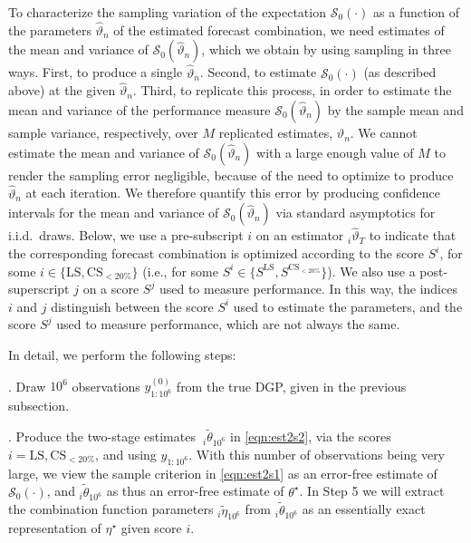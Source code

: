 \documentclass[12pt]{article}
\theoremstyle{definition}
\theoremstyle{remark}
\begin{document}
To characterize the sampling variation of the expectation $\mathcal{S}_0(\cdot)$ as a function of the parameters $\hat{\vartheta}_n$ of the estimated forecast combination, we need estimates of the mean and variance of $\mathcal{S}_0(\hat{\vartheta}_n)$, which we obtain by using sampling in three ways. First, to produce a single $\hat{\vartheta}_n$. Second, to estimate $\mathcal{S}_0(\cdot)$ (as described above) at the given $\hat{\vartheta}_n$. Third, to replicate this process, in order to estimate the mean and variance of the performance measure $\mathcal{S}_0(\hat{\vartheta}_n)$ by the sample mean and sample variance, respectively, over $M$ replicated estimates, $\hat{\vartheta}_n$. We cannot estimate the mean and variance of $\mathcal{S}_0(\hat{\vartheta}_n)$ with a large enough value of $M$ to render the sampling error negligible, because of the need to optimize to produce $\hat{\vartheta}_n$ at each iteration. We therefore quantify this error by producing confidence intervals for the mean and variance of $\mathcal{S}_0(\hat{\vartheta}_n)$ via standard asymptotics for i.i.d.\ draws. Below, we use a pre-subscript $i$ on an estimator ${}_i \hat{\vartheta}_T$ to indicate that the corresponding forecast combination is optimized according to the score $S^i$, for some $i \in \{\mathrm{LS}, \mathrm{CS}_{<20\%}\}$ (i.e., for some $S^i \in \{S^{\mathrm{LS}}, S^{\mathrm{CS}_{<20\%}}\}$). We also use a post-superscript $j$ on a score $S^j$ used to measure performance. In this way, the indices $i$ and $j$ distinguish between the score $S^i$ used to estimate the parameters, and the score $S^j$ used to measure performance, which are not always the same.

In detail, we perform the following steps:

\medskip

. Draw $10^6$ observations $y^{(0)}_{1:10^6}$ from the true DGP, given in the previous subsection.

\medskip

. Produce the two-stage estimates\textbf{\ }${}_{i}\tilde{\theta}_{10^{6}}$ in \eqref{eqn:est2s2}, via the scores $i=\mathrm{LS},\mathrm{CS}_{<20\%}$, and using $y_{1:10^{6}}$. With this number of observations being very large, we view the sample criterion in \eqref{eqn:est2s1} as an error-free estimate of $\mathcal{S}_{0}(\cdot )$, and ${}_{i}\tilde{\theta}_{10^{6}}$ as thus an error-free estimate of $\theta ^{\star }$. In Step 5 we will extract the combination function parameters ${}_{i}\tilde{\eta}_{10^{6}}$ from ${}_{i}\tilde{\theta}_{10^{6}}$ as an essentially exact representation of $\eta ^{\star }$ given score $i$.
\end{document}
